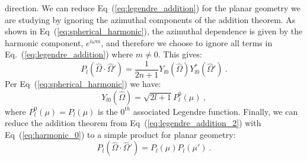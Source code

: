 \documentclass[letterpaper,12pt]{article}
\begin{document}
direction. We can reduce Eq~(\ref{eq:legendre_addition}) for the
planar geometry we are studying by ignoring the azimuthal components
of the addition theorem. As shown in Eq~(\ref{eq:spherical_harmonic}),
the azimuthal dependence is given by the harmonic component, $e^{i
  \omega m}$, and therefore we choose to ignore all terms in
Eq.~(\ref{eq:legendre_addition}) where $m \neq 0$. This gives:
\begin{equation}
  P_l(\hat{\Omega} \cdot \hat{\Omega}') = \frac{1}{2n+1}
  Y_{l0}(\hat{\Omega})Y^*_{l0}(\hat{\Omega}')\:.
  \label{eq:legendre_addition_2}
\end{equation}
Per Eq~(\ref{eq:spherical_harmonic}) we have:
\begin{equation}
  Y_{l0}(\hat{\Omega}) = \sqrt{2l+1}P_l^0(\mu)\:,
  \label{eq:harmonic_0}
\end{equation}
where $P_l^0(\mu) = P_l(\mu)$ is the $0^{th}$ associated Legendre
function. Finally, we can reduce the addition theorem from
Eq~(\ref{eq:legendre_addition_2}) with Eq~(\ref{eq:harmonic_0}) to a
simple product for planar geometry:
\begin{equation}
  P_l(\hat{\Omega} \cdot \hat{\Omega}') = P_l(\mu)P_l(\mu')\:.
  \label{eq:legendre_addition_3}
\end{equation}
\end{document}
